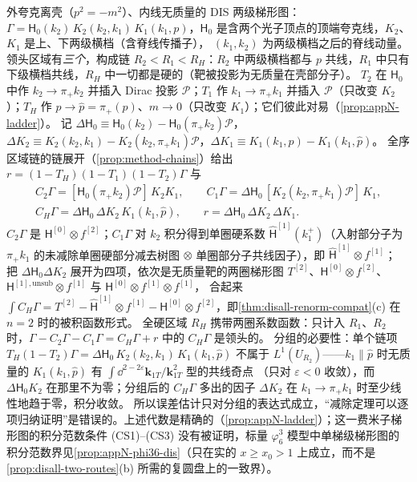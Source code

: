 \begin{example}\label{ex:disall-ladder}
外夸克离壳（$p^2=-m^2$）、内线无质量的 DIS 两级梯形图：$\Gamma=\mathsf H_0(k_2)\,K_2(k_2,k_1)\,K_1(k_1,p)$，$\mathsf H_0$ 是含两个光子顶点的顶端夸克线，$K_2$、$K_1$ 是上、下两级横档（含脊线传播子），
$(k_1,k_2)$ 为两级横档之后的脊线动量。领头区域有\emph{三个}，构成链 $R_2<R_1<R_H$：$R_2$ 中两级横档都与 $p$ 共线，$R_1$ 中只有下级横档共线，$R_H$ 中一切都是硬的（靶被投影为无质量在壳部分子）。
$T_2$ 在 $\mathsf H_0$ 中作 $k_2\to\pi_+k_2$ 并插入 Dirac 投影 $\mathcal P$；$T_1$ 作 $k_1\to\pi_+k_1$ 并插入 $\mathcal P$（只改变 $K_2$）；$T_H$ 作 $p\to\hat p=\pi_+(p)$、$m\to0$（只改变 $K_1$）；它们彼此对易（\cref{prop:appN-ladder}）。
记 $\Delta\mathsf H_0\equiv\mathsf H_0(k_2)-\mathsf H_0(\pi_+k_2)\mathcal P$，$\Delta K_2\equiv K_2(k_2,k_1)-K_2(k_2,\pi_+k_1)\mathcal P$，$\Delta K_1\equiv K_1(k_1,p)-K_1(k_1,\hat p)$。
全序区域链的链展开（\cref{prop:method-chains}）给出 $r=(1-T_H)(1-T_1)(1-T_2)\Gamma$ 与
\begin{equation}\label{eq:disall-ladder}
\begin{gathered}
C_2\Gamma=[\mathsf H_0(\pi_+k_2)\mathcal P]\,K_2K_1,\qquad C_1\Gamma=\Delta\mathsf H_0\,[K_2(k_2,\pi_+k_1)\mathcal P]\,K_1,\\
C_H\Gamma=\Delta\mathsf H_0\,\Delta K_2\,K_1(k_1,\hat p),\qquad r=\Delta\mathsf H_0\,\Delta K_2\,\Delta K_1 .
\end{gathered}
\end{equation}
$C_2\Gamma$ 是 $\mathsf H^{[0]}\otimes f^{[2]}$；$C_1\Gamma$ 对 $k_2$ 积分得到单圈硬系数 $\hat{\mathsf H}^{[1]}(k_1^+)$（入射部分子为 $\pi_+k_1$ 的未减除单圈硬部分减去树图 $\otimes$ 单圈部分子共线因子），即 $\hat{\mathsf H}^{[1]}\otimes f^{[1]}$；
把 $\Delta\mathsf H_0\Delta K_2$ 展开为四项，依次是无质量靶的两圈梯形图 $T^{[2]}$、$\mathsf H^{[0]}\otimes f^{[2]}$、$\mathsf H^{[1],\mathrm{unsub}}\otimes f^{[1]}$ 与 $\mathsf H^{[0]}\otimes f^{[1]}\otimes f^{[1]}$，
合起来 $\int C_H\Gamma=T^{[2]}-\hat{\mathsf H}^{[1]}\otimes f^{[1]}-\mathsf H^{[0]}\otimes f^{[2]}$，即\cref{thm:disall-renorm-compat}(c) 在 $n=2$ 时的被积函数形式。
全硬区域 $R_H$ 携带两圈系数函数：只计入 $R_1$、$R_2$ 时，$\Gamma-C_2\Gamma-C_1\Gamma=C_H\Gamma+r$ 中的 $C_H\Gamma$ 是领头的。
分组的必要性：单个链项 $T_H(1-T_2)\Gamma=\Delta\mathsf H_0\,K_2(k_2,k_1)\,K_1(k_1,\hat p)$ 不属于 $L^1(U_{R_2})$——$k_1\parallel\hat p$ 时无质量的 $K_1(k_1,\hat p)$ 有 $\int\dd^{2-2\varepsilon}\mathbf k_{1T}/\mathbf k_{1T}^2$ 型的共线奇点
（只对 $\varepsilon<0$ 收敛），而 $\Delta\mathsf H_0K_2$ 在那里不为零；分组后的 $C_H\Gamma$ 多出的因子 $\Delta K_2$ 在 $k_1\to\pi_+k_1$ 时至少线性地趋于零，积分收敛。
所以误差估计只对分组的表达式成立，“减除定理可以逐项归纳证明”是错误的。上述代数是精确的（\cref{prop:appN-ladder}）；这一费米子梯形图的积分范数条件 (CS1)–(CS3) 没有被证明，标量 $\varphi^3_6$ 模型中单梯级梯形图的积分范数界见\cref{prop:appN-phi36-dis}（只在实的 $x\ge x_0>1$ 上成立，而不是\cref{prop:disall-two-routes}(b) 所需的复圆盘上的一致界）。
\end{example}

